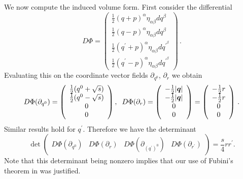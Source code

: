  We now compute the induced volume form.  First consider the differential 
\begin{equation}
 D\Phi=\left( \begin{array}{c}
\frac{1}{2}(q+p)^\alpha\eta_{\alpha\beta}dq^\beta \\
\frac{1}{2}(q-p)^\alpha\eta_{\alpha\beta}dq^\beta\\
\frac{1}{2}(q^{\prime}+p)^\alpha\eta_{\alpha\beta}dq^{'^\beta}  \\
\frac{1}{2}(q^{\prime}-p)^\alpha\eta_{\alpha\beta}dq^{'^\beta}  \end{array} \right)\,.
\end{equation}
Evaluating this on the coordinate vector fields $\partial_{q^0}$, $\partial_r$ we obtain
\begin{equation}
 D\Phi(\partial_{q^0})=\left( \begin{array}{c}
\frac{1}{2}(q^0+\sqrt{s}) \\
\frac{1}{2}(q^0-\sqrt{s}) \\
0\\
0 \end{array} \right), \hspace{2mm}  D\Phi(\partial_{r})=\left( \begin{array}{c}
-\frac{1}{2}|\vec{q}| \\
-\frac{1}{2}|\vec{q}| \\
0\\
0 \end{array} \right)=\left( \begin{array}{c}
-\frac{1}{2}r \\
-\frac{1}{2}r \\
0\\
0 \end{array} \right)\,.
\end{equation}
Similar results hold for $q^{\prime}$.  Therefore we have the determinant
\begin{equation}
\det\left( \begin{array}{cccc}
D\Phi(\partial_{q^0}) & D\Phi(\partial_{r}) & D\Phi(\partial_{(q^{\prime})^0}) & D\Phi(\partial_{r^{\prime}}) \end{array} \right)=\frac{s}{4}rr^{\prime}.
\end{equation}
Note that this determinant being nonzero implies that our use of Fubini's theorem in  was justified.

